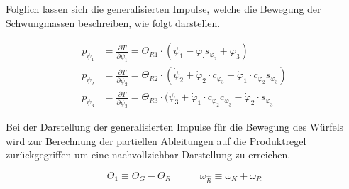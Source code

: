 Folglich lassen sich die generalisierten Impulse, welche die Bewegung der Schwungmassen beschreiben, wie folgt darstellen.

\begin{align}
p_{\psi_1} & = \frac{\partial T}{\partial \dot{\psi}_1} = \Theta_{R1} \cdot (\dot{\psi}_1 - \dot{\varphi}_ \cdot s_{\varphi_2} + \dot{\varphi}_3)
\\
p_{\psi_2} & = \frac{\partial T}{\partial \dot{\psi}_2} = \Theta_{R2} \cdot (\dot{\psi}_2 + \dot{\varphi}_2 \cdot c_{\varphi_3} + \dot{\varphi}_1 \cdot c_{\varphi_2}s_{\varphi_3})
\\
p_{\psi_3} & = \frac{\partial T}{\partial \dot{\psi}_3} = \Theta_{R3} \cdot (\dot{\psi}_3 + \dot{\varphi}_1 \cdot c_{\varphi_2}c_{\varphi_3} - \dot{\varphi}_2 \cdot s_{\varphi_3}
\end{align}

Bei der Darstellung der generalisierten Impulse für die Bewegung des Würfels wird zur Berechnung der partiellen Ableitungen auf die Produktregel zurückgegriffen um eine nachvollziehbar Darstellung zu erreichen.

\begin{equation}
\Theta_1 \equiv \Theta_G - \Theta_R \hspace{35pt} \omega_{\widehat{R}} \equiv \omega_K  + \omega_R
\end{equation}

